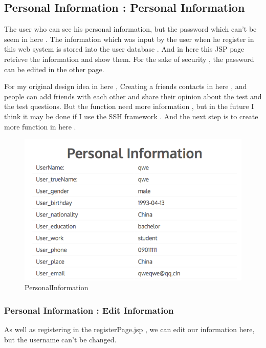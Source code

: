 \documentclass[12pt]{article}
\begin{document}
\subsection{Personal Information : Personal Information}
The user who can see his personal information, but the password which can't be seem in here .  The information which was input by the user when he register in this web system is stored into the user database . And in here this JSP page retrieve the information and show them. For the sake of security , the password can be edited in the other page.  

For my original design idea in here , Creating a  friends contacts in here , and people can add friends with each other and share their opinion about the test and the test questions. But the function need more information , but in the future I think it may be done if I use the SSH framework .  And the next step is to create more function in here .

\begin{figure}[H]
	\centering	
\includegraphics[width=15cm]{images/PersonalInformation.jpg}
	\caption[PersonalInformation]{PersonalInformation}
	\label{fig:PersonalInformation}
\end{figure}
\newpage




\cleardoublepage

\subsubsection{Personal Information : Edit Information}
As well as registering in the registerPage.jsp , we can edit our information here, but the username can't be changed. 
\end{document}
